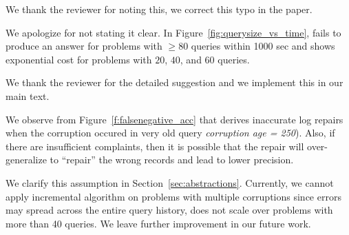 

\begin{quote}
\end{quote}

We thank the reviewer for noting this, we correct this typo in the paper. 


\begin{quote}
\end{quote}
We apologize for not stating it clear. In Figure~\ref{fig:querysize_vs_time}, \naive fails to produce an answer
 for problems with $\geq 80$ queries within 1000 sec and \naive shows exponential cost for problems with $20$, $40$, and $60$ queries. 


\begin{quote}
\end{quote}

We thank the reviewer for the detailed suggestion and we implement this in our main text. 

\begin{quote}
\end{quote}

We observe from Figure~\ref{f:falsenegative_acc} that \sys derives inaccurate log repairs when the corruption occured in 
very old query  \textit{corruption age = 250}). Also, if there are insufficient complaints, then it is possible that the 
repair will over-generalize to  ``repair'' the wrong records and lead to lower precision.

 

\begin{quote}
\end{quote}

We clarify this assumption in Section~\ref{sec:abstractions}. Currently, we cannot apply incremental algorithm 
on problems with multiple corruptions since errors may spread across the entire query history, \sys 
does not scale over problems with more than 40 queries. We leave further improvement in our future work.



